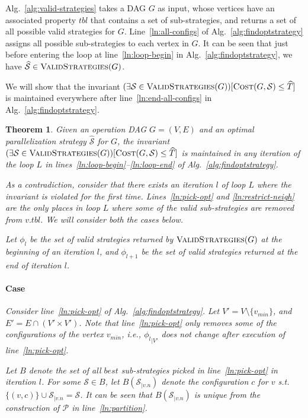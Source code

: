 \documentclass{article}
\newcommand{\rom}[1]{\uppercase\expandafter{\romannumeral #1\relax}}
\newcommand{\strategy}{\mathcal{S}}
\newcommand{\optstrategy}{\widehat{\mathcal{S}}}
\newcommand{\optcost}{\widehat{T}}
\newcommand{\minv}{v_{min}}
\newtheorem{theorem}{Theorem}
\newcommand{\set}[1]{\{#1\}}
\begin{document}
Alg.~\ref{alg:valid-strategies} takes a DAG $G$ as input, whose vertices
have an associated property $tbl$ that contains a set of sub-strategies, and
returns a set of all possible valid strategies for $G$.
Line~\ref{ln:all-configs} of Alg.~\ref{alg:findoptstrategy} assigns all possible
sub-strategies to each vertex in $G$. It can be seen that just before
entering the loop at line~\ref{ln:loop-begin} in Alg.~\ref{alg:findoptstrategy},
we have $\optstrategy \in \Call{ValidStrategies}{G}$.

We will show that the invariant $(\exists\strategy \in
\Call{ValidStrategies}{G})[\Call{Cost}{G, \strategy} \le \optcost]$ is
maintained everywhere after line~\ref{ln:end-all-configs} in
Alg.~\ref{alg:findoptstrategy}.

\begin{theorem}
	Given an operation DAG $G=(V,E)$ and an optimal parallelization strategy
	$\optstrategy$ for $G$,  the invariant $(\exists\strategy \in
	\Call{ValidStrategies}{G})[\Call{Cost}{G, \strategy} \le \optcost]$ is
	maintained in any iteration of the loop $L$ in
	lines~\ref{ln:loop-begin}--\ref{ln:loop-end} of
	Alg.~\ref{alg:findoptstrategy}.

	\proof
	As a contradiction, consider that there exists an iteration $l$ of loop $L$
	where the invariant is violated for the first time. 
	Lines~\ref{ln:pick-opt} and \ref{ln:restrict-neigh} are the only places in
	loop $L$ where some of the valid sub-strategies are removed from $v.tbl$. We
	will consider both the cases below.

	Let $\phi_{l}$ be the set of valid strategies returned by
	$\Call{ValidStrategies}{G}$ at the beginning of an iteration $l$, and
	$\phi_{l+1}$ be the set of valid strategies returned at the end of iteration
	$l$.

	\paragraph{Case \rom{1}}
	Consider line~\ref{ln:pick-opt} of Alg.~\ref{alg:findoptstrategy}.
	Let $V' = V \setminus \set{\minv}$, and $E' = E \cap (V'\times V')$.
	Note that line~\ref{ln:pick-opt} only removes some of the configurations of
	the vertex $\minv$, i.e., ${\phi_l}_{|V'}$ does not change after execution of
	line~\ref{ln:pick-opt}. 

	Let $B$ denote the set of all $best$ sub-strategies picked in
	line~\ref{ln:pick-opt} in iteration $l$. For some $\strategy \in B$,
	let $B(\strategy_{|v.n})$ denote the configuration $c$ for $v$ s.t.
	$\set{(v,c)} \cup \strategy_{|v.n} = \strategy$.
	It can be seen that $B(\strategy_{|v.n})$ is unique from the construction of
	$\mathcal{P}$ in line~\ref{ln:partition}. 
	

\end{theorem}
\end{document}
